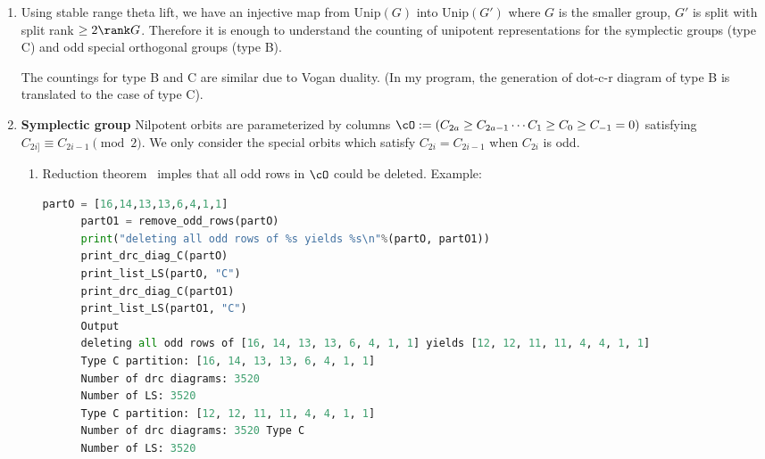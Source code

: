 \documentclass[12pt,a4paper]{amsart}
\newcommand{\n}{\mathfrak n}
\numberwithin{equation}{section}
\theoremstyle{remark}
\def\Unip{\mathrm{Unip}}
\begin{document}
\begin{enumerate}
\item Using stable range theta lift, we have an injective map from $\Unip(G)$
  into $\Unip(G')$ where $G$ is the smaller group,  $G'$ is split with 
  split rank $\geq 2 \rank G$.  Therefore it is enough to understand the
  counting of unipotent representations for the symplectic groups (type C) and
  odd special orthogonal groups (type B).

  The countings for type B and C are similar due to Vogan duality. (In my
  program, the generation of dot-c-r diagram of type B is translated to the case
  of type C).
  
\item {\bfseries Symplectic group} Nilpotent orbits are parameterized by columns
  $\cO := (C_{2a}\geq C_{2a-1}\cdots C_1\geq C_0 \geq C_{-1}=0)$ satisfying
  $C_{2i]}\equiv C_{2i-1} \pmod{2}$.  We only consider the special orbits which
  satisfy $C_{2i}=C_{2i-1}$ when $C_{2i}$ is odd.
  \begin{enumerate}
  \item Reduction theorem~ imples that all odd rows in
    $\cO$ could be deleted.  Example:
    \begin{lstlisting}[language={Python}]
      partO = [16,14,13,13,6,4,1,1]
      partO1 = remove_odd_rows(partO)
      print("deleting all odd rows of %s yields %s\n"%(partO, partO1))
      print_drc_diag_C(partO)
      print_list_LS(partO, "C")
      print_drc_diag_C(partO1)
      print_list_LS(partO1, "C")
      Output
      deleting all odd rows of [16, 14, 13, 13, 6, 4, 1, 1] yields [12, 12, 11, 11, 4, 4, 1, 1]
      Type C partition: [16, 14, 13, 13, 6, 4, 1, 1]
      Number of drc diagrams: 3520
      Number of LS: 3520
      Type C partition: [12, 12, 11, 11, 4, 4, 1, 1]
      Number of drc diagrams: 3520 Type C
      Number of LS: 3520
    \end{lstlisting}


\end{enumerate}
\end{enumerate}
\end{document}
